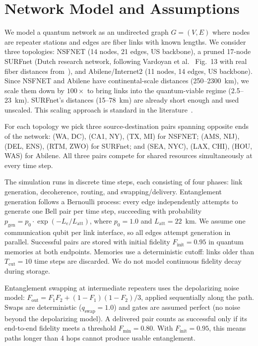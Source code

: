\section{Network Model and Assumptions}
\label{sec:model}

We model a quantum network as an undirected graph $G = (V, E)$ where nodes are repeater stations and edges are fiber links with known lengths. We consider three topologies: NSFNET (14 nodes, 21 edges, US backbone), a pruned 17-node SURFnet (Dutch research network, following Vardoyan et al.~\cite{vardoyan2024bipartite} Fig.~13 with real fiber distances from~\cite{pouryousef2024resource}), and Abilene/Internet2 (11 nodes, 14 edges, US backbone). Since NSFNET and Abilene have continental-scale distances (250--2300~km), we scale them down by $100\times$ to bring links into the quantum-viable regime (2.5--23~km). SURFnet's distances (15--78~km) are already short enough and used unscaled. This scaling approach is standard in the literature~\cite{vardoyan2024bipartite, pouryousef2024resource}.

For each topology we pick three source-destination pairs spanning opposite ends of the network: (WA, DC), (CA1, NY), (TX, MI) for NSFNET; (AMS, NIJ), (DEL, ENS), (RTM, ZWO) for SURFnet; and (SEA, NYC), (LAX, CHI), (HOU, WAS) for Abilene. All three pairs compete for shared resources simultaneously at every time step.

The simulation runs in discrete time steps, each consisting of four phases: link generation, decoherence, routing, and swapping/delivery. Entanglement generation follows a Bernoulli process: every edge independently attempts to generate one Bell pair per time step, succeeding with probability $p_\text{gen} = p_0 \cdot \exp(-L_e / L_\text{att})$, where $p_0 = 1.0$ and $L_\text{att} = 22$~km. We assume one communication qubit per link interface, so all edges attempt generation in parallel. Successful pairs are stored with initial fidelity $F_\text{init} = 0.95$ in quantum memories at both endpoints. Memories use a deterministic cutoff: links older than $T_\text{cut} = 10$ time steps are discarded. We do not model continuous fidelity decay during storage.

Entanglement swapping at intermediate repeaters uses the depolarizing noise model: $F_\text{out} = F_1 F_2 + (1 - F_1)(1 - F_2)/3$, applied sequentially along the path. Swaps are deterministic ($q_\text{swap} = 1.0$) and gates are assumed perfect (no noise beyond the depolarizing model). A delivered pair counts as successful only if its end-to-end fidelity meets a threshold $F_\text{min} = 0.80$. With $F_\text{init} = 0.95$, this means paths longer than 4 hops cannot produce usable entanglement.

